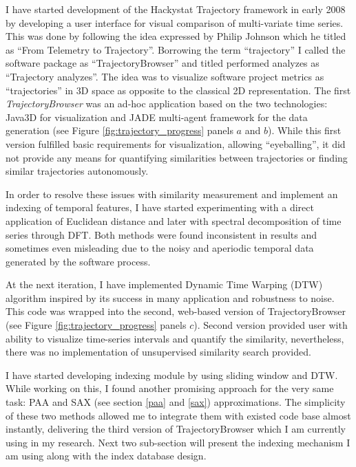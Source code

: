 I have started development of the Hackystat Trajectory framework in early 2008 by developing a user interface for visual comparison of multi-variate time series. This was done by following the idea expressed by Philip Johnson which he titled as ``From Telemetry to Trajectory''. Borrowing the term ``trajectory'' I called the software package as ``TrajectoryBrowser'' and titled performed analyzes as ``Trajectory analyzes''. The idea was to visualize software project metrics as ``trajectories'' in 3D space as opposite to the classical 2D representation. The first \textit{TrajectoryBrowser} was an ad-hoc application based on the two technologies: Java3D for visualization and JADE multi-agent framework \cite{citeulike:1230319} for the data generation (see Figure \ref{fig:trajectory_progress} panels $a$ and $b$). While this first version fulfilled basic requirements for visualization, allowing ``eyeballing'', it did not provide any means for quantifying similarities between trajectories or finding similar trajectories autonomously.

In order to resolve these issues with similarity measurement and implement an indexing of temporal features, I have started experimenting with a direct application of Euclidean distance and later with spectral decomposition of time series through DFT. Both methods were found inconsistent in results and sometimes even misleading due to the noisy and aperiodic temporal data generated by the software process. 

At the next iteration, I have implemented Dynamic Time Warping (DTW) algorithm inspired by its success in many application and robustness to noise. This code was wrapped into the second, web-based version of TrajectoryBrowser (see Figure \ref{fig:trajectory_progress} panels $c$). Second version provided user with ability to visualize time-series intervals and quantify the similarity, nevertheless, there was no implementation of unsupervised similarity search provided.

I have started developing indexing module by using sliding window and DTW. While working on this, I found another promising approach for the very same task: PAA and SAX (see section \ref{paa} and \ref{sax}) approximations. The simplicity of these two methods allowed me to integrate them with existed code base almost instantly, delivering the third version of TrajectoryBrowser which I am currently using in my research. Next two sub-section will present the indexing mechanism I am using along with the index database design. 

